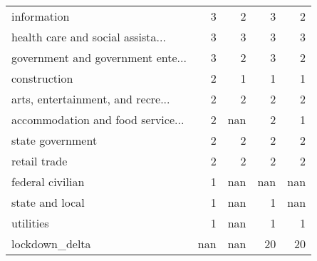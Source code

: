 \begin{tabular}{lrrrr}
 information                       &                      3 &                     2 &                      3 &                     2 \\
 health care and social assista... &                      3 &                     3 &                      3 &                     3 \\
 government and government ente... &                      3 &                     2 &                      3 &                     2 \\
 construction                      &                      2 &                     1 &                      1 &                     1 \\
 arts, entertainment, and recre... &                      2 &                     2 &                      2 &                     2 \\
 accommodation and food service... &                      2 &                   nan &                      2 &                     1 \\
 state government                  &                      2 &                     2 &                      2 &                     2 \\
 retail trade                      &                      2 &                     2 &                      2 &                     2 \\
 federal civilian                  &                      1 &                   nan &                    nan &                   nan \\
 state and local                   &                      1 &                   nan &                      1 &                   nan \\
 utilities                         &                      1 &                   nan &                      1 &                     1 \\
 lockdown\_delta                    &                    nan &                   nan &                     20 &                    20 \\
\hline
\end{tabular}